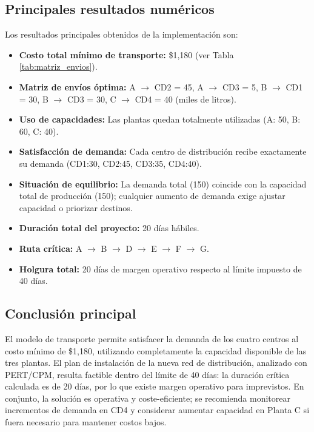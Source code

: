 \documentclass[12pt]{article}
\begin{document}
\subsection{Principales resultados numéricos}
Los resultados principales obtenidos de la implementación son:
\begin{itemize}
    \item \textbf{Costo total mínimo de transporte:} \$1,180 (ver Tabla \ref{tab:matriz_envios}).
    \item \textbf{Matriz de envíos óptima:} A $\rightarrow$ CD2 = 45, A $\rightarrow$ CD3 = 5, B $\rightarrow$ CD1 = 30, B $\rightarrow$ CD3 = 30, C $\rightarrow$ CD4 = 40 (miles de litros).
    \item \textbf{Uso de capacidades:} Las plantas quedan totalmente utilizadas (A: 50, B: 60, C: 40).
    \item \textbf{Satisfacción de demanda:} Cada centro de distribución recibe exactamente su demanda (CD1:30, CD2:45, CD3:35, CD4:40).
    \item \textbf{Situación de equilibrio:} La demanda total (150) coincide con la capacidad total de producción (150); cualquier aumento de demanda exige ajustar capacidad o priorizar destinos.
    \item \textbf{Duración total del proyecto:} 20 días hábiles.
    \item \textbf{Ruta crítica:} A $\rightarrow$ B $\rightarrow$ D $\rightarrow$ E $\rightarrow$ F $\rightarrow$ G.
    \item \textbf{Holgura total:} 20 días de margen operativo respecto al límite impuesto de 40 días.
\end{itemize}

\subsection{Conclusión principal}
El modelo de transporte permite satisfacer la demanda de los cuatro centros al costo mínimo de \$1,180, utilizando completamente la capacidad disponible de las tres plantas. El plan de instalación de la nueva red de distribución, analizado con PERT/CPM, resulta factible dentro del límite de 40 días: la duración crítica calculada es de 20 días, por lo que existe margen operativo para imprevistos. En conjunto, la solución es operativa y coste-eficiente; se recomienda monitorear incrementos de demanda en CD4 y considerar aumentar capacidad en Planta C si fuera necesario para mantener costos bajos.

\end{document}

